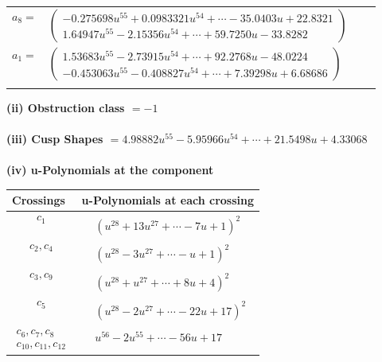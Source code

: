 \documentclass[1p]{elsarticle_modified}
\theoremstyle{definition}
\begin{document}
\begin{tabular}{m{7pt} m{180pt} m{7pt} m{180pt} }
\flushright $a_{8}=$&$\begin{pmatrix}-0.275698 u^{55}+0.0983321 u^{54}+\cdots-35.0403 u+22.8321\\1.64947 u^{55}-2.15356 u^{54}+\cdots+59.7250 u-33.8282\end{pmatrix}$ \\
\flushright $a_{1}=$&$\begin{pmatrix}1.53683 u^{55}-2.73915 u^{54}+\cdots+92.2768 u-48.0224\\-0.453063 u^{55}-0.408827 u^{54}+\cdots+7.39298 u+6.68686\end{pmatrix}$\\&\end{tabular}
\flushleft \textbf{(ii) Obstruction class $= -1$}\\~\\
\flushleft \textbf{(iii) Cusp Shapes $= 4.98882 u^{55}-5.95966 u^{54}+\cdots+21.5498 u+4.33068$}\\~\\
\newpage\renewcommand{\arraystretch}{1}
\flushleft \textbf{(iv) u-Polynomials at the component}\newline \\
\begin{tabular}{m{50pt}|m{274pt}}
Crossings & \hspace{64pt}u-Polynomials at each crossing \\
\hline $$\begin{aligned}c_{1}\end{aligned}$$&$\begin{aligned}
&(u^{28}+13 u^{27}+\cdots-7 u+1)^{2}
\end{aligned}$\\
\hline $$\begin{aligned}c_{2},c_{4}\end{aligned}$$&$\begin{aligned}
&(u^{28}-3 u^{27}+\cdots- u+1)^{2}
\end{aligned}$\\
\hline $$\begin{aligned}c_{3},c_{9}\end{aligned}$$&$\begin{aligned}
&(u^{28}+u^{27}+\cdots+8 u+4)^{2}
\end{aligned}$\\
\hline $$\begin{aligned}c_{5}\end{aligned}$$&$\begin{aligned}
&(u^{28}-2 u^{27}+\cdots-22 u+17)^{2}
\end{aligned}$\\
\hline $$\begin{aligned}c_{6},c_{7},c_{8}\\c_{10},c_{11},c_{12}\end{aligned}$$&$\begin{aligned}
&u^{56}-2 u^{55}+\cdots-56 u+17
\end{aligned}$\\
\hline
\end{tabular}\\~\\
\end{document}
